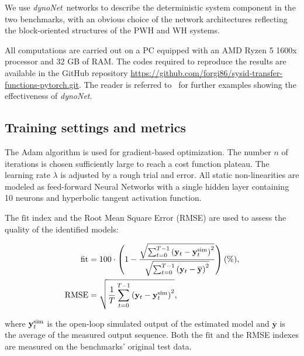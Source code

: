 \documentclass{article}
\newcommand{\tvec}[1]{\mathbf{#1}}
\newcommand{\nsamp}{T}
\newcommand{\simul}{{\rm sim}}
\newcommand{\Name}{\emph{dynoNet}}
\begin{document}
We use \Name\ networks to describe the deterministic system component in the two benchmarks, with 
an obvious choice of the network architectures reflecting the block-oriented structures of the  PWH and WH systems.

All computations are carried out on a PC equipped with an AMD Ryzen 5 1600x processor and 32 GB of RAM.
 The codes required to reproduce the results   are available in the GitHub repository \url{https://github.com/forgi86/sysid-transfer-functions-pytorch.git}.  The   reader is referred to~\cite{forgione2021dynonet} for further examples showing the effectiveness of \Name.


\subsection{Training settings and metrics}
The Adam algorithm \cite{kingma2014adam} is used for gradient-based optimization. The number $n$ of iterations  is chosen sufficiently large to reach a cost function plateau. The learning rate $\lambda$ is adjusted by a rough trial and error. All static non-linearities   are modeled as feed-forward Neural Networks with a single hidden layer containing 10 neurons and hyperbolic tangent activation function. %




The $\mathrm{fit}$ index and the Root Mean Square Error (RMSE) are used to assess the quality of the identified models: 
\begin{footnotesize}
	\begin{align*}
 \mathrm{fit} &= 100\cdot \left(1- \frac{\sqrt{\sum_{t=0}^{\nsamp-1} \left(\tvec{y}_t - \tvec{y}^{\simul}_t\right)^2} }  
{\sqrt{\sum_{t=0}^{\nsamp-1} \left(\tvec{y}_t -  {\overline{{\tvec{y}}}}\right)^2}}\right) (\%), 
\\ 
\mathrm{RMSE} &= \sqrt{\frac{1}{\nsamp} \sum_{t=0}^{\nsamp-1} \left(\tvec{y}_t - \tvec{y}^{\simul}_t\right)^2}, 
\end{align*}
\end{footnotesize}
where $\tvec{y}^{\simul}_t$ is the open-loop simulated output of the estimated  model   
and $\overline{\tvec{y}}$ is the average   of the measured output sequence.  Both the $\mathrm{fit}$ and the RMSE indexes   are measured  on the benchmarks' original test data.
\end{document}
